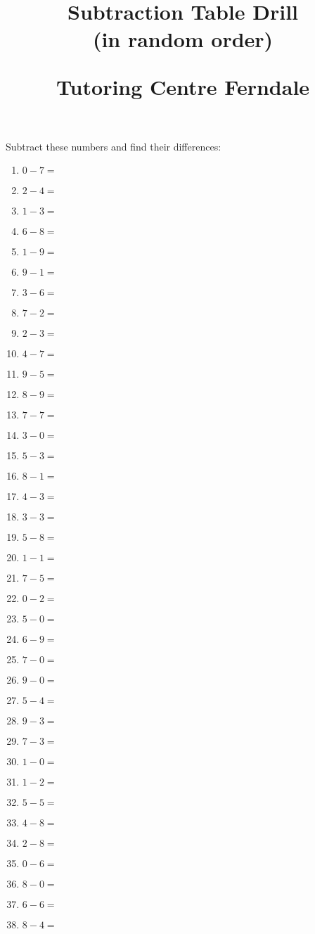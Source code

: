 \documentclass{article}
\title{Subtraction Table Drill\\(in random order)\\
\begin{normalsize}
Tutoring Centre Ferndale
\end{normalsize}}
\author{}
\date{}
\begin{document}
\maketitle
\thispagestyle{empty}

\noindent Subtract these numbers and find their differences:

\begin{multicols}{5}
\begin{enumerate}

\item $0 - 7 =$
\item $2 - 4 =$
\item $1 - 3 =$
\item $6 - 8 =$
\item $1 - 9 =$
\item $9 - 1 =$
\item $3 - 6 =$
\item $7 - 2 =$
\item $2 - 3 =$
\item $4 - 7 =$
\item $9 - 5 =$
\item $8 - 9 =$
\item $7 - 7 =$
\item $3 - 0 =$
\item $5 - 3 =$
\item $8 - 1 =$
\item $4 - 3 =$
\item $3 - 3 =$
\item $5 - 8 =$
\item $1 - 1 =$
\item $7 - 5 =$
\item $0 - 2 =$
\item $5 - 0 =$
\item $6 - 9 =$
\item $7 - 0 =$
\item $9 - 0 =$
\item $5 - 4 =$
\item $9 - 3 =$
\item $7 - 3 =$
\item $1 - 0 =$
\item $1 - 2 =$
\item $5 - 5 =$
\item $4 - 8 =$
\item $2 - 8 =$
\item $0 - 6 =$
\item $8 - 0 =$
\item $6 - 6 =$
\item $8 - 4 =$

\end{enumerate}
\end{multicols}
\end{document}
